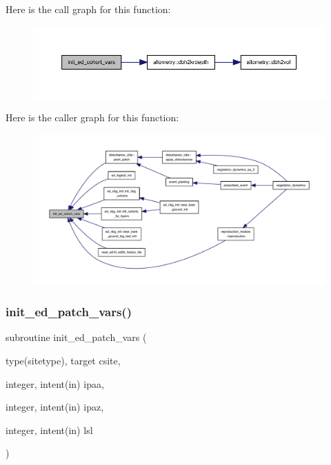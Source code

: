 Here is the call graph for this function\+:
\nopagebreak
\begin{figure}[H]
\begin{center}
\leavevmode
\includegraphics[width=350pt]{ed__type__init_8f90_af7c8e0a520dfca016f7eb7cf1c08b6ca_cgraph}
\end{center}
\end{figure}
Here is the caller graph for this function\+:
\nopagebreak
\begin{figure}[H]
\begin{center}
\leavevmode
\includegraphics[width=350pt]{ed__type__init_8f90_af7c8e0a520dfca016f7eb7cf1c08b6ca_icgraph}
\end{center}
\end{figure}
\mbox{\label{ed__type__init_8f90_ad4cd2d9291dc969b63d1592d0f2a3164}} 
\subsubsection{\texorpdfstring{init\+\_\+ed\+\_\+patch\+\_\+vars()}{init\_ed\_patch\_vars()}}
{\footnotesize\ttfamily subroutine init\+\_\+ed\+\_\+patch\+\_\+vars (\begin{DoxyParamCaption}\item[{type(sitetype), target}]{csite,  }\item[{integer, intent(in)}]{ipaa,  }\item[{integer, intent(in)}]{ipaz,  }\item[{integer, intent(in)}]{lsl }\end{DoxyParamCaption})}

